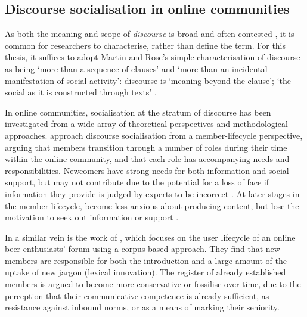 \subsection{Discourse socialisation in online communities}

As both the meaning and scope of \emph{discourse} is broad and often contested \cite{gee_discourse_2004,gee_introduction_2013}, it is common for researchers to characterise, rather than define the term. For this thesis, it suffices to adopt Martin and Rose's simple characterisation of discourse as being `more than a sequence of clauses' and `more than an incidental manifestation of social activity': discourse is `meaning beyond the clause'; `the social as it is constructed through texts' \parencite*[p.~1]{martin_working_2003}.

In online communities, socialisation at the stratum of discourse has been investigated from a wide array of theoretical perspectives and methodological approaches. \textcite{lee_new_2014} approach discourse socialisation from a member\hyp{}lifecycle perspective, arguing that \glspl{member} transition through a number of roles during their time within the online community, and that each role has accompanying needs and responsibilities. Newcomers have strong needs for both information and social support, but may not contribute due to the potential for a loss of face if information they provide is judged by experts to be incorrect \cite{fuller_innovation_2007}. At later stages in the member lifecycle,  become less anxious about producing content, but lose the motivation to seek out information or support \cite{lee_new_2014}. %

In a similar vein is the work of \textcite{danescu-niculescu-mizil_no_2013}, which focuses on the user lifecycle of an online beer enthusiasts' \gls{forum} using a corpus\hyp{}based approach. They find that new \glspl{member} are responsible for both the introduction and a large amount of the uptake of new jargon (lexical innovation). The register of already established \glspl{member} is argued to become more conservative or fossilise over time, due to the perception that their communicative competence is already sufficient, as resistance against inbound norms, or as a means of marking their seniority.


